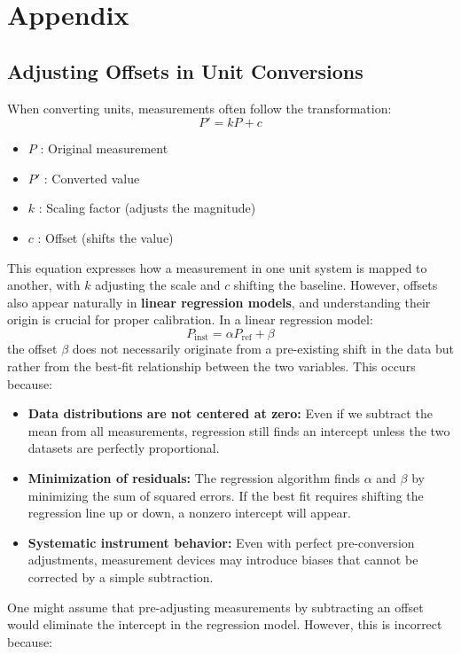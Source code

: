 \documentclass{article}
\newcommand{\wm}[2]{%
	\begin{minipage}{#1\textwidth}
		\centering
		#2
	\end{minipage}%
}
\newcounter{dataset}
\begin{document}
\section{Appendix}
\renewcommand{\thesubsection}{\Alph{subsection}}
\normalsize
\subsection{Adjusting Offsets in Unit Conversions}\label{Adjusting Offsets in Unit Conversions}
When converting units, measurements often follow the transformation:
\begin{equation}
	P' = kP + c
\end{equation}
\begin{center}
	\hspace{1em}\wm{0.4}{\begin{itemize}[itemsep=-1mm]
			\item \(P\) : Original measurement
			\item \(P'\) : Converted value
			\item \(k\) : Scaling factor (adjusts the magnitude)
			\item \(c\) : Offset (shifts the value)
	\end{itemize}}
\end{center}
This equation expresses how a measurement in one unit system is mapped to another, with \( k \) adjusting the scale and \( c \) shifting the baseline. However, offsets also appear naturally in \textbf{linear regression models}, and understanding their origin is crucial for proper calibration. In a linear regression model:
\[P_{\text{inst}} = \alpha P_{\text{ref}} + \beta\]
the offset \( \beta \) does not necessarily originate from a pre-existing shift in the data but rather from the best-fit relationship between the two variables. This occurs because:
\begin{itemize}
	\item \textbf{Data distributions are not centered at zero:} Even if we subtract the mean from all measurements, regression still finds an intercept unless the two datasets are perfectly proportional.
	\item \textbf{Minimization of residuals:} The regression algorithm finds \( \alpha \) and \( \beta \) by minimizing the sum of squared errors. If the best fit requires shifting the regression line up or down, a nonzero intercept will appear.
	\item \textbf{Systematic instrument behavior:} Even with perfect pre-conversion adjustments, measurement devices may introduce biases that cannot be corrected by a simple subtraction.
\end{itemize}
One might assume that pre-adjusting measurements by subtracting an offset would eliminate the intercept in the regression model. However, this is incorrect because:
\end{document}
